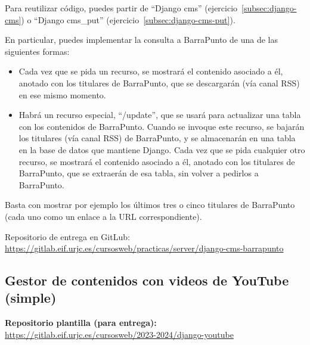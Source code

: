 
Para reutilizar código, puedes partir de ``Django cms'' (ejercicio~\ref{subsec:django-cms}) o  ``Django cms\_put'' (ejercicio~\ref{subsec:django-cms-put}).

En particular, puedes implementar la consulta a BarraPunto de una de las siguientes formas:

\begin{itemize}
\item Cada vez que se pida un recurso, se mostrará el contenido asociado a él, anotado con los titulares de BarraPunto, que se descargarán (vía canal RSS) en ese mismo momento.
\item Habrá un recurso especial, ``/update'', que se usará para actualizar una tabla con los contenidos de BarraPunto. Cuando se invoque este recurso, se bajarán los titulares (vía canal RSS) de BarraPunto, y se almacenarán en una tabla en la base de datos que mantiene Django. Cada vez que se pida cualquier otro recurso, se mostrará el contenido asociado a él, anotado con los titulares de BarraPunto, que se extraerán de esa tabla, sin volver a pedirlos a BarraPunto.
\end{itemize}

Basta con mostrar por ejemplo los últimos tres o cinco titulares de BarraPunto (cada uno como un enlace a la URL correspondiente).

Repositorio de entrega en  GitLub: \\
\url{https://gitlab.eif.urjc.es/cursosweb/practicas/server/django-cms-barrapunto}

\subsection{Gestor de contenidos con videos de YouTube (simple)}
\label{subsec:django-cms-youtube}

\textbf{Repositorio plantilla (para entrega):} \\
\url{https://gitlab.eif.urjc.es/cursosweb/2023-2024/django-youtube}

